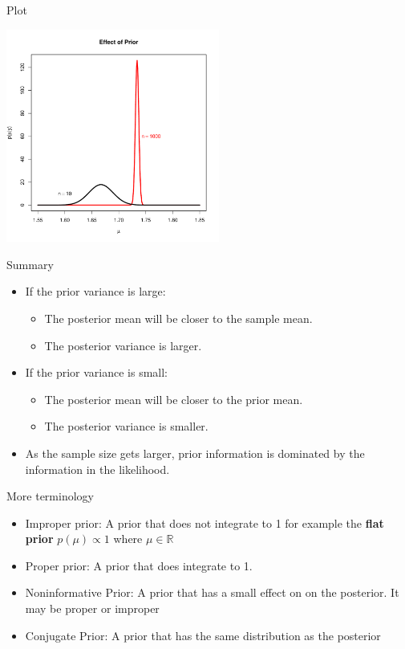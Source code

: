 \documentclass[10pt]{beamer}
\begin{document}
\begin{frame}{Plot}
  \begin{center}
    \includegraphics[height=7cm]{./Pics/compare2.pdf}
  \end{center}
\end{frame}
\begin{frame}{Summary}
  \begin{itemize}
  \item If the prior variance is large:

    \begin{itemize}
    \item The posterior mean will be closer to the sample mean.
    \item The posterior variance is larger.
    \end{itemize}

  \item If the prior variance is small:

    \begin{itemize}
    \item The posterior mean will be closer to the prior mean.
    \item The posterior variance is smaller.
    \end{itemize}

  \item As the sample size gets larger, prior information is dominated by the information in the likelihood.
  \end{itemize}
\end{frame}
\begin{frame}{More terminology}
  \begin{itemize}
  \item Improper prior: A prior that does not integrate to 1 for example the {\bf flat prior} $p(\mu)\propto 1$ where $\mu\in\mathbb{R}$

  \item Proper prior: A prior that does integrate to 1.

  \item Noninformative Prior: A prior that has a small effect on on the posterior.  It may be proper or improper

  \item Conjugate Prior: A prior that has the same distribution as the posterior
  \end{itemize}
\end{frame}
\end{document}
